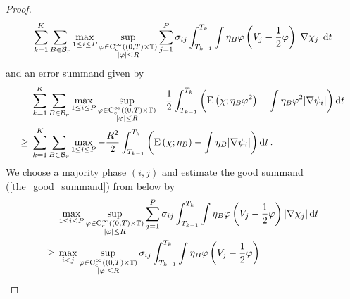 \begin{proof}
\begin{equation}
		\label{the_good_summand}
		\sum_{ k = 1 }^{ K }
		\sum_{ B \in \mathcal{ B }_{ r } }
		\max_{ 1 \leq i \leq P }
		\sup_{ 
			\substack{ 
				\varphi \in \operatorname{C}_{ \mathrm{c} }^{ \infty } 
				\left( ( 0 , T ) \times \operatorname{\mathbb{T}} \right)
				\\
				\abs{ \varphi } \leq R  
			}
		}
		\sum_{ j = 1 }^{ P }
		\sigma_{ i j }
		\int_{ T_{ k - 1 } }^{ T_{ k } } 
		\int\eta_{ B }
		\varphi 
		\left( V_{ j } - \frac{ 1 }{ 2 } \varphi \right)
		\abs{ \nabla \chi_{ j } }
		\dd{ t } 
	\end{equation}
	and an error summand given by
	\begin{align}
		\notag
		& \sum_{ k = 1 }^{ K }
			\sum_{ B \in \mathcal{ B }_{ r } }
				\max_{ 1 \leq i \leq P }
					\sup_{ \substack{ 
							\varphi \in \operatorname{C}_{ \mathrm{c} }^{ \infty } 
							\left( ( 0 , T ) \times \operatorname{\mathbb{T}} \right)
							\\
							\abs{ \varphi } \leq R  
					} }
				- \frac{ 1 }{ 2 }
				\int_{ T_{ k - 1 } }^{ T_{ k } }
				\left(
				\operatorname{E} \left( \chi ; \eta_{ B } \varphi^{ 2 } \right)
				-
				\int
				\eta_{ B }
				\varphi^{ 2 }
				\abs{ \nabla \psi_{ i } }
				\right)
				\dd{ t }
		\\
		\label{minor_error_term}
		\geq{} &
		\sum_{ k = 1 }^{ K }
		\sum_{ B \in \mathcal{ B }_{ r } }
		\max_{ 1 \leq i \leq P }
		- \frac{ R^{ 2 } }{ 2 }
		\int_{ T_{ k - 1 } }^{ T_{ k } }
		\left(
		\operatorname{E} \left( \chi ; \eta_{ B } \right)
		-
		\int
		\eta_{ B }
		\abs{ \nabla \psi_{ i } }
		\right)
		\dd{ t }.
	\end{align}
	We choose a majority phase $ ( i , j ) $ and estimate the good 
	summand (\ref{the_good_summand}) from below by
	\begin{align}
		\notag
		& \max_{ 1 \leq i \leq P }
		\sup_{ \substack{ 
				\varphi \in \cont_{ \mathrm{c} }^{ \infty } 
				\left( ( 0 , T ) \times \flattorus \right)
				\\
				\abs{ \varphi } \leq R  
		} }
		\sum_{ j = 1 }^{ P }
			\sigma_{ i j }
			\int_{ T_{ k  - 1 } }^{ T_{ k } }
				\int
					\eta_{ B } \varphi
					\left( V_{ j } - \frac{ 1 }{ 2 } \varphi  \right)
				\abs{ \nabla \chi_{ j } }
			\dd{ t }
		\\
		\notag
		\geq{} &
		\max_{ i < j }
		\sup_{ \substack{ 
				\varphi \in \cont_{ \mathrm{c} }^{ \infty } 
				\left( ( 0 , T ) \times \flattorus \right)
				\\
				\abs{ \varphi } \leq R  
		} }
		\sigma_{ i j }
		\int_{ T_{ k  - 1 } }^{ T_{ k } }
		\int
		\eta_{ B } \varphi
		\left( V_{ j } - \frac{ 1 }{ 2 } \varphi  \right)

\end{align}
\end{proof}
